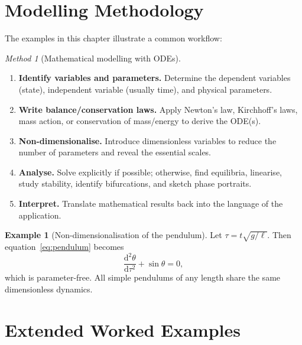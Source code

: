 \documentclass[12pt,a4paper,openany]{book}
\theoremstyle{definition}
\newtheorem{example}[definition]{Example}
\theoremstyle{plain}
\theoremstyle{remark}
\newtheorem{method}[definition]{Method}
\newcommand{\dd}{\mathrm{d}}
\begin{document}
\section{Modelling Methodology}
\label{sec:modelling-methodology}

The examples in this chapter illustrate a common workflow:

\begin{method}[Mathematical modelling with ODEs]
\label{meth:ode-modelling}
\begin{enumerate}[label=\textbf{Step \arabic*.}]
  \item \textbf{Identify variables and parameters.} Determine the
    dependent variables (state), independent variable (usually time),
    and physical parameters.
  \item \textbf{Write balance/conservation laws.} Apply Newton's law,
    Kirchhoff's laws, mass action, or conservation of mass/energy to
    derive the ODE(s).
  \item \textbf{Non-dimensionalise.} Introduce dimensionless
    variables to reduce the number of parameters and reveal the
    essential scales.
  \item \textbf{Analyse.} Solve explicitly if possible; otherwise,
    find equilibria, linearise, study stability, identify
    bifurcations, and sketch phase portraits.
  \item \textbf{Interpret.} Translate mathematical results back into
    the language of the application.
\end{enumerate}
\end{method}

\begin{example}[Non-dimensionalisation of the pendulum]
\label{ex:nondim-pendulum}
Let $\tau=t\sqrt{g/\ell}$. Then
equation~\eqref{eq:pendulum} becomes
\[
  \frac{\dd^{2}\theta}{\dd\tau^{2}} + \sin\theta = 0,
\]
which is parameter-free. All simple pendulums of any length share the
same dimensionless dynamics.
\end{example}

\section{Extended Worked Examples}
\label{sec:extended-examples}
\end{document}

